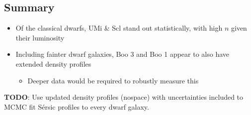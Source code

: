 \subsection{Summary}\label{summary}

\begin{itemize}
\tightlist
\item
  Of the classical dwarfs, UMi \& Scl stand out statistically, with high
  \(n\) given their luminosity
\item
  Including fainter dwarf galaxies, Boo 3 and Boo 1 appear to also have
  extended density profiles

  \begin{itemize}
  \tightlist
  \item
    Deeper data would be required to robustly measure this
  \end{itemize}
\end{itemize}

\textbf{TODO}: Use updated density profiles (nospace) with uncertainties
included to MCMC fit Sérsic profiles to every dwarf galaxy.
